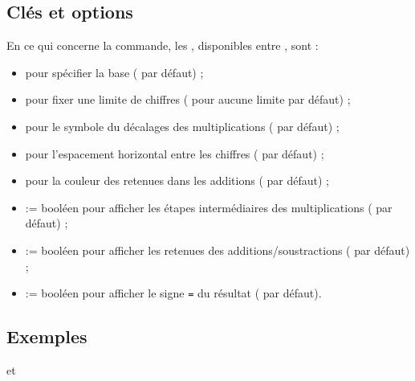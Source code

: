 \begin{PresCodePL}{}
\end{PresCodePL}

\subsection{Clés et options}

\begin{cautionblock}
En ce qui concerne la commande, les , disponibles entre \Cle{[...]}, sont :

\begin{itemize}
	\item {} pour spécifier la base ( par défaut) ;
	\item {} pour fixer une limite de chiffres ( pour aucune limite par défaut) ;
	\item {} pour le symbole du décalages des multiplications ( par défaut) ;
	\item {} pour l'espacement horizontal entre les chiffres (\Cle{6pt} par défaut) ;
	\item {} pour la couleur des retenues dans les additions ( par défaut) ;
	\item {} := booléen pour afficher les étapes intermédiaires des multiplications ( par défaut) ;
	\item {} := booléen pour afficher les retenues des additions/soustractions ( par défaut) ;
	\item {} := booléen pour afficher le signe \texttt{=} du résultat ( par défaut).
\end{itemize}
\end{cautionblock}

\subsection{Exemples}

\begin{PresCodePL}{}
\end{PresCodePL}

\begin{PresCodePL}{}
 et
\end{PresCodePL}

